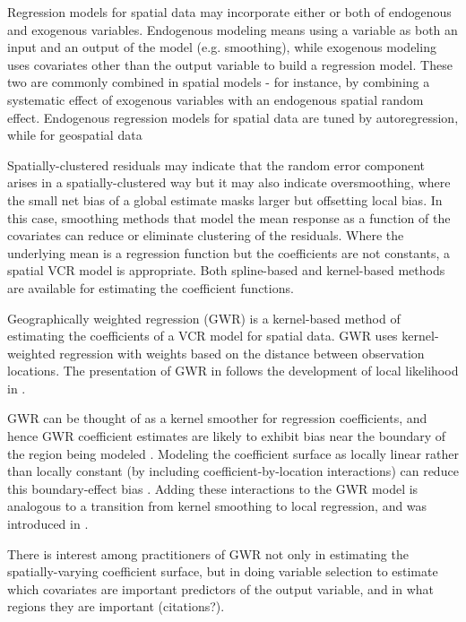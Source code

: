 \documentclass[authoryear, review, 11pt]{elsarticle}
\begin{document}
	Regression models for spatial data may incorporate either or both of endogenous and exogenous variables. Endogenous modeling means using a variable as both an input and an output of the model (e.g. smoothing), while exogenous modeling uses covariates other than the output variable to build a regression model. These two are commonly combined in spatial models - for instance, by combining a systematic effect of exogenous variables with an endogenous spatial random effect.
	Endogenous regression models for spatial data are tuned by autoregression, while for geospatial data 

	Spatially-clustered residuals may indicate that the random error component arises in a spatially-clustered way but it may also indicate oversmoothing, where the small net bias of a global estimate masks larger but offsetting local bias. In this case, smoothing methods that model the mean response as a function of the covariates can reduce or eliminate clustering of the residuals. Where the underlying mean is a regression function but the coefficients are not constants, a spatial VCR model is appropriate. Both spline-based \citep{Wood:2006} and kernel-based \citep{Fotheringham:2002} methods are available for estimating the coefficient functions. 
	
	Geographically weighted regression (GWR) \citep{Fotheringham:2002} is a kernel-based method of estimating the coefficients of a VCR model for spatial data. GWR uses kernel-weighted regression with weights based on the distance between observation locations. The presentation of GWR in \cite{Fotheringham:2002} follows the development of local likelihood in \cite{Loader:1999}.
	
	GWR can be thought of as a kernel smoother for regression coefficients, and hence GWR coefficient estimates are likely to exhibit bias near the boundary of the region being modeled \citep{Hastie:1993b}. Modeling the coefficient surface as locally linear rather than locally constant (by including coefficient-by-location interactions) can reduce this boundary-effect bias \citep{Hastie:1993b}. Adding these interactions to the GWR model is analogous to a transition from kernel smoothing to local regression, and was introduced in \cite{Wang:2008b}.
	
	There is interest among practitioners of GWR not only in estimating the spatially-varying coefficient surface, but in doing variable selection to estimate which covariates are important predictors of the output variable, and in what regions they are important (citations?).
	
\end{document}
